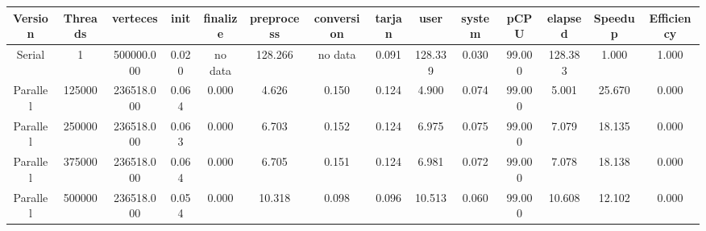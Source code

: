 \begin{tabular}{|c|c|c|c|c|c|c|c|c|c|c|c|c|c|}
\toprule
 Version &  Threads &   verteces &  init & finalize &  preprocess & conversion &  tarjan &    user &  system &   pCPU &  elapsed &  Speedup &  Efficiency \\
\midrule
  Serial &        1 & 500000.000 & 0.020 &  no data &     128.266 &    no data &   0.091 & 128.339 &   0.030 & 99.000 &  128.383 &    1.000 &       1.000 \\
Parallel &   125000 & 236518.000 & 0.064 &    0.000 &       4.626 &      0.150 &   0.124 &   4.900 &   0.074 & 99.000 &    5.001 &   25.670 &       0.000 \\
Parallel &   250000 & 236518.000 & 0.063 &    0.000 &       6.703 &      0.152 &   0.124 &   6.975 &   0.075 & 99.000 &    7.079 &   18.135 &       0.000 \\
Parallel &   375000 & 236518.000 & 0.064 &    0.000 &       6.705 &      0.151 &   0.124 &   6.981 &   0.072 & 99.000 &    7.078 &   18.138 &       0.000 \\
Parallel &   500000 & 236518.000 & 0.054 &    0.000 &      10.318 &      0.098 &   0.096 &  10.513 &   0.060 & 99.000 &   10.608 &   12.102 &       0.000 \\
\bottomrule
\end{tabular}
